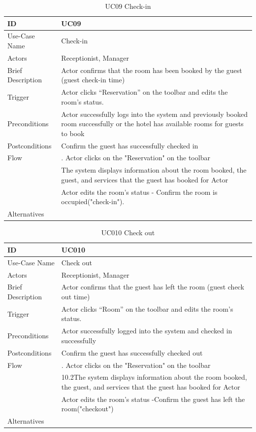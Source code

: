 \begin{table}
\begin{tabular}{|>{\raggedright\arraybackslash}p{5cm}|>{\raggedright\arraybackslash}p{10cm}|}
\hline
ID& UC09 \\
\hline
Use-Case Name& Check-in\\
\hline
Actors& Receptionist, Manager\\
\hline
Brief Description& Actor confirms that the room has been booked by the guest (guest check-in time)\\
\hline
Trigger& Actor clicks “Reservation” on the toolbar and edits the room's status.\\
\hline
Preconditions & Actor successfully logs into the system and previously booked room successfully or the hotel has available rooms for guests to book\\
\hline
Postconditions & Confirm the guest has successfully checked in\\
\hline
Flow& 9.1. Actor clicks on the "Reservation" on the toolbar \\ &9.2  The system displays information about the room booked, the guest, and services that the guest has booked for Actor \\& 9.3 Actor edits the room's status - Confirm the room is occupied("check-in").
\\
\hline
Alternatives& \\
\hline
\end{tabular}

\caption{UC09 Check-in}
\label{tab:UC09}
\end{table}
\begin{table}
\begin{tabular}{|>{\raggedright\arraybackslash}p{5cm}|>{\raggedright\arraybackslash}p{10cm}|}
\hline
ID& UC010 \\
\hline
Use-Case Name& Check out\\
\hline
Actors& Receptionist, Manager\\
\hline
Brief Description& Actor confirms that the guest has left the room (guest check out time)\\
\hline
Trigger& Actor clicks “Room” on the toolbar and edits the room's status.\\

\hline
Preconditions & Actor successfully logged into the system and checked in successfully\\
\hline
Postconditions& Confirm the guest has successfully checked out\\
\hline
Flow& 10.1. Actor clicks on the "Reservation" on the toolbar \\ & 10.2The system displays information about the room booked, the guest, and services that the guest has booked for Actor \\& 10.3 Actor edits the room's status -Confirm the guest has left the room("checkout")
\\
\hline
Alternatives& \\
\hline
\end{tabular}

\caption{UC010 Check out}
\label{tab:UC010}
\end{table}

